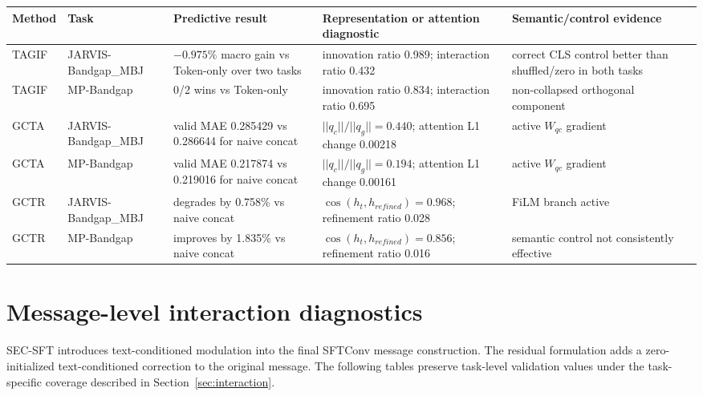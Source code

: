 \documentclass[a4paper,fleqn]{cas-sc}
\begin{document}
\begin{center}
\begin{minipage}{\linewidth}\label{tab:latent_detail}\centering\footnotesize
\begin{tabularx}{\linewidth}{llYYY}\toprule
Method&Task&Predictive result&Representation or attention diagnostic&Semantic/control evidence\\\midrule
TAGIF&JARVIS-Bandgap\_MBJ&$-0.975\%$ macro gain vs Token-only over two tasks&innovation ratio 0.989; interaction ratio 0.432&correct CLS control better than shuffled/zero in both tasks\\
TAGIF&MP-Bandgap&0/2 wins vs Token-only&innovation ratio 0.834; interaction ratio 0.695&non-collapsed orthogonal component\\
GCTA&JARVIS-Bandgap\_MBJ&valid MAE 0.285429 vs 0.286644 for naive concat&$||q_c||/||q_g||=0.440$; attention L1 change 0.00218&active $W_{qc}$ gradient\\
GCTA&MP-Bandgap&valid MAE 0.217874 vs 0.219016 for naive concat&$||q_c||/||q_g||=0.194$; attention L1 change 0.00161&active $W_{qc}$ gradient\\
GCTR&JARVIS-Bandgap\_MBJ&degrades by 0.758\% vs naive concat&$\cos(h_t,h_{refined})=0.968$; refinement ratio 0.028&FiLM branch active\\
GCTR&MP-Bandgap&improves by 1.835\% vs naive concat&$\cos(h_t,h_{refined})=0.856$; refinement ratio 0.016&semantic control not consistently effective\\\bottomrule
\end{tabularx}
\end{minipage}
\end{center}

\FloatBarrier
\section{Message-level interaction diagnostics}\label{app:message}
SEC-SFT introduces text-conditioned modulation into the final SFTConv message construction. The residual formulation adds a zero-initialized text-conditioned correction to the original message. The following tables preserve task-level validation values under the task-specific coverage described in Section~\ref{sec:interaction}.
\end{document}
